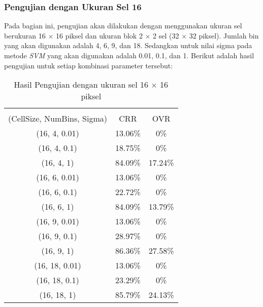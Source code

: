 \subsubsection{Pengujian dengan Ukuran Sel 16}
\noindent Pada bagian ini, pengujian akan dilakukan dengan menggunakan ukuran sel berukuran 16 $\times$ 16 piksel dan ukuran blok 2 $\times$ 2 sel (32 $\times$ 32 piksel). Jumlah bin yang akan digunakan adalah 4, 6, 9, dan 18. Sedangkan untuk nilai sigma pada metode \textit{SVM} yang akan digunakan adalah 0.01, 0.1, dan 1. Berikut adalah hasil pengujian untuk setiap kombinasi parameter tersebut:
\begin{longtable}[c]{|c|c|c|}
	\caption{Hasil Pengujian dengan ukuran sel 16 $\times$ 16 piksel}
	\label{tab:HasilPengujianSel16}\\
	\hline
	\begin{tabular}[c]{@{}c@{}}Parameter\\ (CellSize, NumBins, Sigma)\end{tabular} & CRR     & OVR     \\ \hline
	\endhead
	(16, 4, 0.01)                                                                   & 13.06\% & 0\% \\ \hline
	(16, 4, 0.1)                                                                    & 18.75\% & 0\%     \\ \hline
	(16, 4, 1)                                                                      & 84.09\% & 17.24\%     \\ \hline
	(16, 6, 0.01)                                                                   & 13.06\% & 0\%  \\ \hline
	(16, 6, 0.1)                                                                    & 22.72\% & 0\%     \\ \hline
	(16, 6, 1)                                                                      & 84.09\% & 13.79\%     \\ \hline
	(16, 9, 0.01)                                                                   & 13.06\% & 0\%  \\ \hline
	(16, 9, 0.1)                                                                    & 28.97\% & 0\%     \\ \hline
	(16, 9, 1)                                                                      & {\color[HTML]{FE0000} 86.36\%} & {\color[HTML]{FE0000} 27.58\%}     \\ \hline
	(16, 18, 0.01)                                                                  & 13.06\% & 0\%  \\ \hline
	(16, 18, 0.1)                                                                   & 23.29\% & 0\%     \\ \hline
	(16, 18, 1)                                                                     & 85.79\% & 24.13\%     \\ \hline
\end{longtable}
